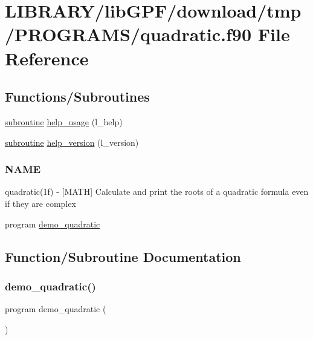 \hypertarget{quadratic_8f90}{}\section{L\+I\+B\+R\+A\+R\+Y/lib\+G\+P\+F/download/tmp/\+P\+R\+O\+G\+R\+A\+M\+S/quadratic.f90 File Reference}
\label{quadratic_8f90}
\subsection*{Functions/\+Subroutines}
\begin{DoxyCompactItemize}
\item 
\hyperlink{M__stopwatch_83_8txt_acfbcff50169d691ff02d4a123ed70482}{subroutine} \hyperlink{quadratic_8f90_a3e09a3b52ee8fb04eeb93fe5761626a8}{help\+\_\+usage} (l\+\_\+help)
\item 
\hyperlink{M__stopwatch_83_8txt_acfbcff50169d691ff02d4a123ed70482}{subroutine} \hyperlink{quadratic_8f90_a39c21619b08a3c22f19e2306efd7f766}{help\+\_\+version} (l\+\_\+version)
\begin{DoxyCompactList}\small\item\em \subsubsection*{N\+A\+ME}

quadratic(1f) -\/ \mbox{[}M\+A\+TH\mbox{]} Calculate and print the roots of a quadratic formula even if they are complex \end{DoxyCompactList}\item 
program \hyperlink{quadratic_8f90_a70f6d33f92261a5c0c975b0272b23140}{demo\+\_\+quadratic}
\end{DoxyCompactItemize}


\subsection{Function/\+Subroutine Documentation}
\mbox{\label{quadratic_8f90_a70f6d33f92261a5c0c975b0272b23140}} 
\subsubsection{\texorpdfstring{demo\+\_\+quadratic()}{demo\_quadratic()}}
{\footnotesize\ttfamily program demo\+\_\+quadratic (\begin{DoxyParamCaption}{ }\end{DoxyParamCaption})}



